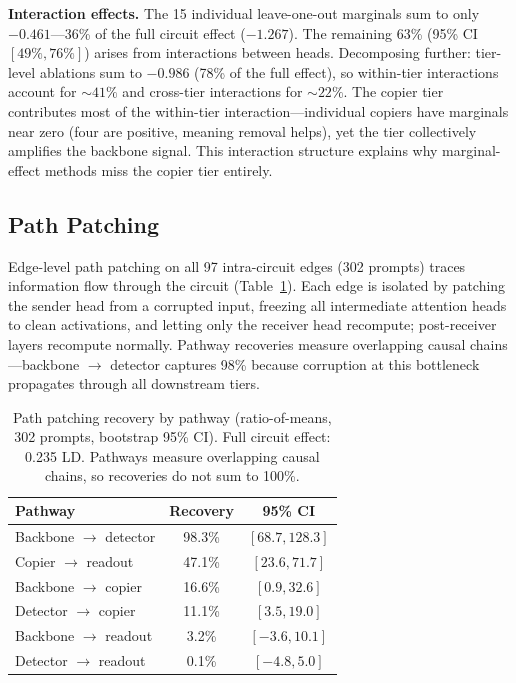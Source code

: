 \documentclass{article}
\begin{document}
\textbf{Interaction effects.}
The 15 individual leave-one-out marginals sum to only $-0.461$---36\%
of the full circuit effect ($-1.267$). The remaining 63\% (95\% CI
$[49\%, 76\%]$) arises from interactions between heads. Decomposing
further: tier-level ablations sum to $-0.986$ (78\% of the full
effect), so within-tier interactions account for ${\sim}41\%$ and
cross-tier interactions for ${\sim}22\%$. The copier tier contributes
most of the within-tier interaction---individual copiers have marginals
near zero (four are positive, meaning removal helps), yet the tier
collectively amplifies the backbone signal. This interaction structure
explains why marginal-effect methods miss the copier tier entirely.

\subsection{Path Patching}

Edge-level path patching \citep{wang2023ioi} on all 97 intra-circuit
edges (302 prompts) traces information flow through the circuit
(Table~\ref{tab:path}). Each edge is isolated by patching the sender
head from a corrupted input, freezing all intermediate attention heads
to clean activations, and letting only the receiver head recompute;
post-receiver layers recompute normally. Pathway recoveries measure
overlapping causal chains---backbone $\to$ detector captures 98\%
because corruption at this bottleneck propagates through all downstream
tiers.

\begin{table}[h]
\centering
\caption{Path patching recovery by pathway (ratio-of-means,
302 prompts, bootstrap 95\% CI). Full circuit effect: 0.235 LD.
Pathways measure overlapping causal chains, so recoveries do not
sum to 100\%.}
\label{tab:path}
\begin{tabular}{lcc}
\toprule
\textbf{Pathway} & \textbf{Recovery} & \textbf{95\% CI} \\
\midrule
Backbone $\to$ detector & 98.3\% & $[68.7, 128.3]$ \\
Copier $\to$ readout & 47.1\% & $[23.6, 71.7]$ \\
Backbone $\to$ copier & 16.6\% & $[0.9, 32.6]$ \\
Detector $\to$ copier & 11.1\% & $[3.5, 19.0]$ \\
Backbone $\to$ readout & 3.2\% & $[-3.6, 10.1]$ \\
Detector $\to$ readout & 0.1\% & $[-4.8, 5.0]$ \\
\bottomrule
\end{tabular}
\end{table}
\end{document}
